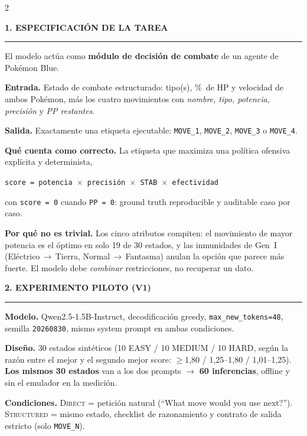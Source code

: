 \documentclass[9pt,a4paper]{extarticle}
\newcommand{\heading}[1]{%
  \par\vspace{1.1mm}\noindent
  {\color{navy}\bfseries\small\MakeUppercase{#1}}
  \par\vspace{0.7mm}\noindent
  {\color{amber}\rule{\linewidth}{1.1pt}}
  \par\vspace{0.6mm}\noindent\ignorespaces}
\begin{document}
\vspace{1.5mm}
\begin{multicols}{2}

\heading{1. Especificaci\'on de la tarea}
El modelo act\'ua como \textbf{m\'odulo de decisi\'on de combate} de un agente de Pok\'emon Blue.

\textbf{Entrada.} Estado de combate estructurado: tipo(s), \%\ de HP y velocidad de ambos Pok\'emon, m\'as los cuatro movimientos con \emph{nombre, tipo, potencia, precisi\'on} y \emph{PP restantes}.

\textbf{Salida.} Exactamente una etiqueta ejecutable: \texttt{MOVE\_1}, \texttt{MOVE\_2}, \texttt{MOVE\_3} o \texttt{MOVE\_4}.

\textbf{Qu\'e cuenta como correcto.} La etiqueta que maximiza una pol\'itica ofensiva expl\'icita y determinista,
\par\vspace{0.6mm}\noindent\hspace*{\fill}%
\colorbox{paper}{\;\texttt{score = potencia $\times$ precisi\'on $\times$ STAB $\times$ efectividad}\;}%
\hspace*{\fill}\par\vspace{0.8mm}\noindent
con \texttt{score = 0} cuando \texttt{PP = 0}: ground truth reproducible y auditable caso por caso.

\textbf{Por qu\'e no es trivial.} Los cinco atributos compiten: el movimiento de mayor potencia es el \'optimo en solo 19 de 30 estados, y las inmunidades de Gen~I (El\'ectrico\,$\to$\,Tierra, Normal\,$\to$\,Fantasma) anulan la opci\'on que parece m\'as fuerte. El modelo debe \emph{combinar} restricciones, no recuperar un dato.

\heading{2. Experimento piloto (v1)}
\textbf{Modelo.} Qwen2.5-1.5B-Instruct, decodificaci\'on greedy, \texttt{max\_new\_tokens=48}, semilla \texttt{20260830}, mismo system prompt en ambas condiciones.

\textbf{Dise\~no.} 30 estados sint\'eticos (10 EASY / 10 MEDIUM / 10 HARD, seg\'un la raz\'on entre el mejor y el segundo mejor score: $\geq$1,80 / 1,25--1,80 / 1,01--1,25). \textbf{Los mismos 30 estados} van a los dos prompts $\rightarrow$ \textbf{60 inferencias}, offline y sin el emulador en la medici\'on.

\textbf{Condiciones.} \textsc{Direct} = petici\'on natural (``What move would you use next?''). \textsc{Structured} = mismo estado, checklist de razonamiento y contrato de salida estricto (solo \texttt{MOVE\_N}).


\end{multicols}
\end{document}
